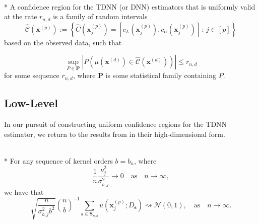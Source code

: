\begin{boxD}
	\begin{dfn}\mbox{}\\*
		A confidence region for the TDNN (or DNN) estimators that is uniformly valid at the rate $r_{n,d}$ is a family of random intervals
		\begin{equation}
			\hat{\mathcal{C}}\left(\mathbf{x}^{(p)}\right)
			:= \left\{\hat{C}(\mathbf{x}^{(p)}_{j})
			= \left[c_{L}(\mathbf{x}^{(p)}_{j}), c_{U}(\mathbf{x}^{(p)}_{j})\right]\, : \, j \in [p]\right\}
		\end{equation}
		based on the observed data, such that
	
		\begin{equation}
			\sup_{P \in \mathbf{P}} \left| P\left(\mu(\mathbf{x}^{(d)}) \in \hat{\mathcal{C}}\left(\mathbf{x}^{(d)}\right)\right) \right| \leq r_{n,d}
		\end{equation}
		for some sequence $r_{n,d}$, where $\mathbf{P}$ is some statistical family containing $P$.
	\end{dfn}
\end{boxD}

\subsection{Low-Level}
In our pursuit of constructing uniform confidence regions for the TDNN estimator, we return to the results from \citet{ritzwoller_uniform_2024} in their high-dimensional form.

\begin{boxD}
	\begin{thm}\label{thm:rit4_1}\mbox{}\\*
		For any sequence of kernel orders $b=b_n$, where
		\begin{equation}
			\frac{1}{n} \frac{\nu_j^2}{\sigma_{b, j}^2} \rightarrow 0
			\quad \text{as} \quad
			n \rightarrow \infty,
		\end{equation}
		we have that
		\begin{equation}
			\sqrt{\frac{n}{\sigma_{b, j}^2 b^2}} \binom{n}{b}^{-1} \sum_{\mathbf{s} \in \mathbf{S}_{n, b}} u\left(\mathbf{x}^{(p)}_{j} ; D_{\mathbf{s}}\right) \rightsquigarrow \mathcal{N}(0,1),
			\quad \text{as} \quad
			n \rightarrow \infty.
		\end{equation}
	\end{thm}
\end{boxD}

